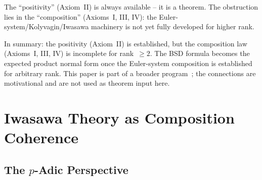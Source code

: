 \documentclass[aps,prd,twocolumn,superscriptaddress,nofootinbib,floatfix]{revtex4-2}
\theoremstyle{definition}
\theoremstyle{remark}
\begin{document}
The ``positivity'' (Axiom~II) is always available -- it is a theorem. The obstruction lies in the ``composition'' (Axioms~I, III, IV): the Euler-system/Kolyvagin/Iwasawa machinery is not yet fully developed for higher rank.

In summary: the positivity (Axiom~II) is established, but the composition law (Axioms~I, III, IV) is incomplete for rank~$\geq 2$. The BSD formula becomes the expected product normal form once the Euler-system composition is established for arbitrary rank. This paper is part of a broader program~\cite{Geiger2026e}; the connections are motivational and are not used as theorem input here.


\section{Iwasawa Theory as Composition Coherence}
\label{sec:iwasawa}

\subsection{\texorpdfstring{The $p$-Adic Perspective}{The p-Adic Perspective}}
\end{document}
